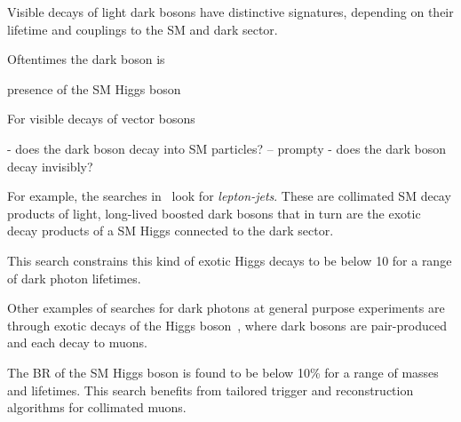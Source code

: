 Visible decays of light dark bosons have distinctive signatures, depending on their lifetime and couplings to the SM and dark sector. 

Oftentimes the dark boson is 

presence of the SM Higgs boson 

For visible decays of vector bosons

- does the dark boson decay into SM particles?
-- prompty
- does the dark boson decay invisibly?

For example, the searches in~\cite{ATLAS:2016jza} look for \textit{lepton-jets}. These are collimated SM decay products of light,
long-lived boosted dark bosons that in turn are the exotic decay products of a SM Higgs connected to the dark sector. 

This search constrains this kind of exotic Higgs decays to be below 10\‰ for a range of dark photon lifetimes. 

Other examples of searches for dark photons at general purpose experiments are through exotic decays of the Higgs boson~\cite{Aad:2015sva,CMS-PAS-HIG-16-035}, where dark bosons are pair-produced and each decay to muons. 



The BR of the SM Higgs boson is found to be below 10\% for a range of masses and lifetimes. This search benefits from tailored
trigger and reconstruction algorithms for collimated muons. 

